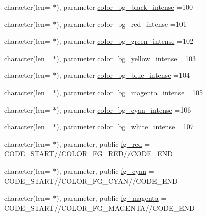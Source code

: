 \begin{DoxyCompactItemize}
\item 
character(len= $\ast$), parameter \mbox{\hyperlink{namespacem__escape_a80a991f9ee93243b6b9bea07f2ec6d03}{color\+\_\+bg\+\_\+black\+\_\+intense}} =\textquotesingle{}100\textquotesingle{}
\item 
character(len= $\ast$), parameter \mbox{\hyperlink{namespacem__escape_aff3cc89066b789384257efec08bf5123}{color\+\_\+bg\+\_\+red\+\_\+intense}} =\textquotesingle{}101\textquotesingle{}
\item 
character(len= $\ast$), parameter \mbox{\hyperlink{namespacem__escape_a9ee5d5f2d0522ca3ea194de4d9a05dc3}{color\+\_\+bg\+\_\+green\+\_\+intense}} =\textquotesingle{}102\textquotesingle{}
\item 
character(len= $\ast$), parameter \mbox{\hyperlink{namespacem__escape_a79f01235a5d3b2ea250274a7ca1c2c43}{color\+\_\+bg\+\_\+yellow\+\_\+intense}} =\textquotesingle{}103\textquotesingle{}
\item 
character(len= $\ast$), parameter \mbox{\hyperlink{namespacem__escape_aac30abbb8eb6e1570e28dac2326113a7}{color\+\_\+bg\+\_\+blue\+\_\+intense}} =\textquotesingle{}104\textquotesingle{}
\item 
character(len= $\ast$), parameter \mbox{\hyperlink{namespacem__escape_af148e03515e36ed552e330ba495bcbba}{color\+\_\+bg\+\_\+magenta\+\_\+intense}} =\textquotesingle{}105\textquotesingle{}
\item 
character(len= $\ast$), parameter \mbox{\hyperlink{namespacem__escape_a6be9fe26e904b8714e035412ae4e6ad4}{color\+\_\+bg\+\_\+cyan\+\_\+intense}} =\textquotesingle{}106\textquotesingle{}
\item 
character(len= $\ast$), parameter \mbox{\hyperlink{namespacem__escape_af57687b3c8741aaab4c67bc1c697aeda}{color\+\_\+bg\+\_\+white\+\_\+intense}} =\textquotesingle{}107\textquotesingle{}
\item 
character(len= $\ast$), parameter, public \mbox{\hyperlink{namespacem__escape_a615ac74b8d93904b5fb35fd656f18aa3}{fg\+\_\+red}} = C\+O\+D\+E\+\_\+\+S\+T\+A\+RT//C\+O\+L\+O\+R\+\_\+\+F\+G\+\_\+\+R\+ED//C\+O\+D\+E\+\_\+\+E\+ND
\item 
character(len= $\ast$), parameter, public \mbox{\hyperlink{namespacem__escape_abdd10ab49027c01752c5a165d42dca95}{fg\+\_\+cyan}} = C\+O\+D\+E\+\_\+\+S\+T\+A\+RT//C\+O\+L\+O\+R\+\_\+\+F\+G\+\_\+\+C\+Y\+AN//C\+O\+D\+E\+\_\+\+E\+ND
\item 
character(len= $\ast$), parameter, public \mbox{\hyperlink{namespacem__escape_a44464db3bf2f3277b04e505bf79061a4}{fg\+\_\+magenta}} = C\+O\+D\+E\+\_\+\+S\+T\+A\+RT//C\+O\+L\+O\+R\+\_\+\+F\+G\+\_\+\+M\+A\+G\+E\+N\+TA//C\+O\+D\+E\+\_\+\+E\+ND

\end{DoxyCompactItemize}
